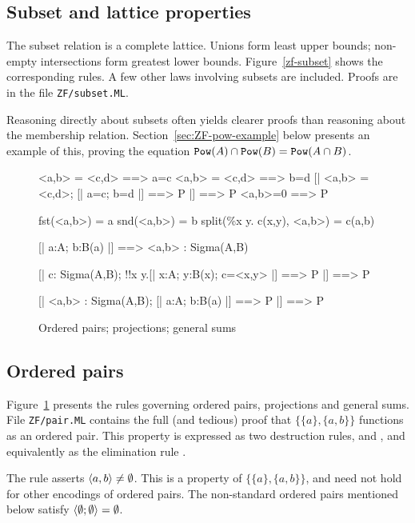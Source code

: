 \subsection{Subset and lattice properties}
The subset relation is a complete lattice.  Unions form least upper bounds;
non-empty intersections form greatest lower bounds.  Figure~\ref{zf-subset}
shows the corresponding rules.  A few other laws involving subsets are
included.  Proofs are in the file \texttt{ZF/subset.ML}.

Reasoning directly about subsets often yields clearer proofs than
reasoning about the membership relation.  Section~\ref{sec:ZF-pow-example}
below presents an example of this, proving the equation ${{\tt Pow}(A)\cap
  {\tt Pow}(B)}= {\tt Pow}(A\cap B)$.


\begin{figure}
\begin{ttbox}
    <a,b> = <c,d> ==> a=c
    <a,b> = <c,d> ==> b=d
     [| <a,b> = <c,d>;  [| a=c; b=d |] ==> P |] ==> P
      <a,b>=0 ==> P

        fst(<a,b>) = a
        snd(<a,b>) = b
           split(\%x y. c(x,y), <a,b>) = c(a,b)

          [| a:A;  b:B(a) |] ==> <a,b> : Sigma(A,B)

          [| c: Sigma(A,B);  
                   !!x y.[| x:A; y:B(x); c=<x,y> |] ==> P |] ==> P

         [| <a,b> : Sigma(A,B);    
                   [| a:A;  b:B(a) |] ==> P   |] ==> P
\end{ttbox}
\caption{Ordered pairs; projections; general sums} \label{zf-pair}
\end{figure}


\subsection{Ordered pairs}
Figure~\ref{zf-pair} presents the rules governing ordered pairs,
projections and general sums.  File \texttt{ZF/pair.ML} contains the
full (and tedious) proof that $\{\{a\},\{a,b\}\}$ functions as an ordered
pair.  This property is expressed as two destruction rules,
 and , and equivalently
as the elimination rule .

The rule  asserts $\langle a,b\rangle\neq\emptyset$.  This
is a property of $\{\{a\},\{a,b\}\}$, and need not hold for other 
encodings of ordered pairs.  The non-standard ordered pairs mentioned below
satisfy $\langle\emptyset;\emptyset\rangle=\emptyset$.

